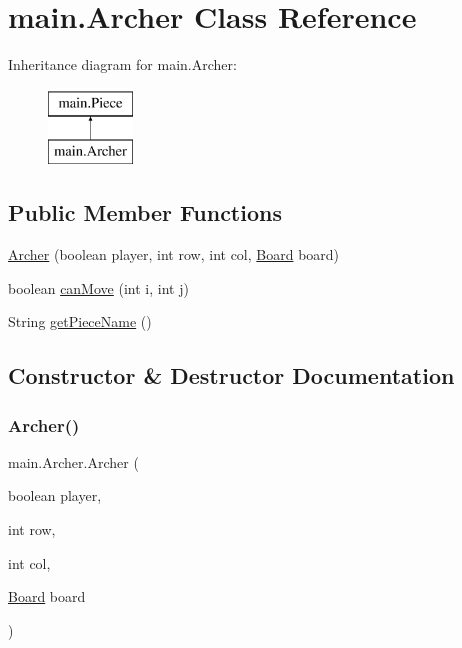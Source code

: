 \hypertarget{classmain_1_1_archer}{}\section{main.\+Archer Class Reference}
\label{classmain_1_1_archer}
Inheritance diagram for main.\+Archer\+:\begin{figure}[H]
\begin{center}
\leavevmode
\includegraphics[height=2.000000cm]{classmain_1_1_archer}
\end{center}
\end{figure}
\subsection*{Public Member Functions}
\begin{DoxyCompactItemize}
\item 
\mbox{\hyperlink{classmain_1_1_archer_acd84f7f4a35c68f26dc9e073b3e09958}{Archer}} (boolean player, int row, int col, \mbox{\hyperlink{classmain_1_1_board}{Board}} board)
\item 
boolean \mbox{\hyperlink{classmain_1_1_archer_a568e88acab994677c762568e38a43679}{can\+Move}} (int i, int j)
\item 
String \mbox{\hyperlink{classmain_1_1_archer_a56a18fea81ee66d4851c35415204a0dd}{get\+Piece\+Name}} ()
\end{DoxyCompactItemize}


\subsection{Constructor \& Destructor Documentation}
\mbox{\label{classmain_1_1_archer_acd84f7f4a35c68f26dc9e073b3e09958}} 
\subsubsection{\texorpdfstring{Archer()}{Archer()}}
{\footnotesize\ttfamily main.\+Archer.\+Archer (\begin{DoxyParamCaption}\item[{boolean}]{player,  }\item[{int}]{row,  }\item[{int}]{col,  }\item[{\mbox{\hyperlink{classmain_1_1_board}{Board}}}]{board }\end{DoxyParamCaption})\hspace{0.3cm}{\ttfamily [inline]}}

